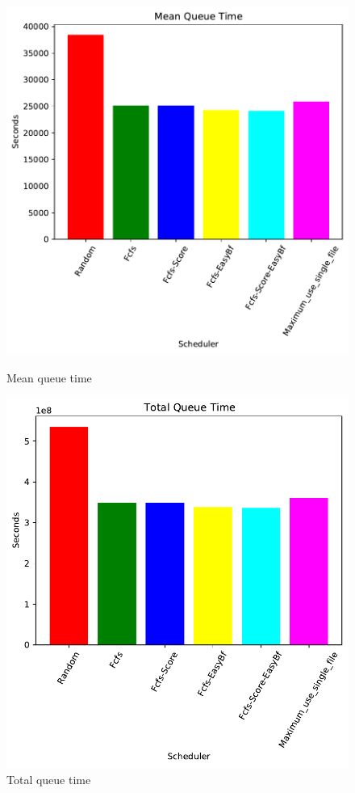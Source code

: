 \documentclass[a4paper]{article}
\begin{document}
\begin{figure}[H]
	\begin{minipage}[b]{0.5\linewidth}\centering\includegraphics[width=1\linewidth]{MBSS/plot/2022-03-16_Mean_queue_time450_128_32_256_4_1024.pdf}\caption{Mean queue time}\vspace{4ex}\end{minipage} 
	\begin{minipage}[b]{0.5\linewidth}\centering\includegraphics[width=1\linewidth]{MBSS/plot/2022-03-16_Total_queue_time450_128_32_256_4_1024.pdf}\caption{Total queue time}\vspace{4ex}\end{minipage}

\end{figure}
\end{document}
